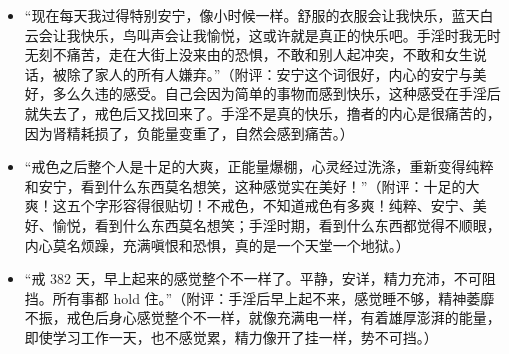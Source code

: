 \begin{case}
    \begin{itemize}
        \item “现在每天我过得特别安宁，像小时候一样。舒服的衣服会让我快乐，蓝天白云会让我快乐，鸟叫声会让我愉悦，这或许就是真正的快乐吧。手淫时我无时无刻不痛苦，走在大街上没来由的恐惧，不敢和别人起冲突，不敢和女生说话，被除了家人的所有人嫌弃。”（附评：安宁这个词很好，内心的安宁与美好，多么久违的感受。自己会因为简单的事物而感到快乐，这种感受在手淫后就失去了，戒色后又找回来了。手淫不是真的快乐，撸者的内心是很痛苦的，因为肾精耗损了，负能量变重了，自然会感到痛苦。）
        \item “戒色之后整个人是十足的大爽，正能量爆棚，心灵经过洗涤，重新变得纯粹和安宁，看到什么东西莫名想笑，这种感觉实在美好！”（附评：十足的大爽！这五个字形容得很贴切！不戒色，不知道戒色有多爽！纯粹、安宁、美好、愉悦，看到什么东西莫名想笑；手淫时期，看到什么东西都觉得不顺眼，内心莫名烦躁，充满嗔恨和恐惧，真的是一个天堂一个地狱。）
        \item “戒 382 天，早上起来的感觉整个不一样了。平静，安详，精力充沛，不可阻挡。所有事都 hold 住。”（附评：手淫后早上起不来，感觉睡不够，精神萎靡不振，戒色后身心感觉整个不一样，就像充满电一样，有着雄厚澎湃的能量，即使学习工作一天，也不感觉累，精力像开了挂一样，势不可挡。）
    \end{itemize}
\end{case}

